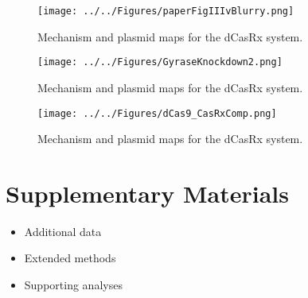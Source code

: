 \documentclass[12pt]{article}
\begin{document}
\begin{figure}
    \centering
    \texttt{[image: ../../Figures/paperFigIIIvBlurry.png]}
    \caption{Mechanism and plasmid maps for the dCasRx system.}
    \label{fig:fig3}
\end{figure}

\begin{figure}
    \centering
    \texttt{[image: ../../Figures/GyraseKnockdown2.png]}
    \caption{Mechanism and plasmid maps for the dCasRx system.}
\label{fig:fig4}
\end{figure}

\begin{figure}
    \centering
    \texttt{[image: ../../Figures/dCas9\_CasRxComp.png]}
    \caption{Mechanism and plasmid maps for the dCasRx system.}
\label{fig:fig6}
\end{figure}


\section*{Supplementary Materials}
\begin{itemize}
    \item Additional data
    \item Extended methods
    \item Supporting analyses
\end{itemize}
\end{document}
